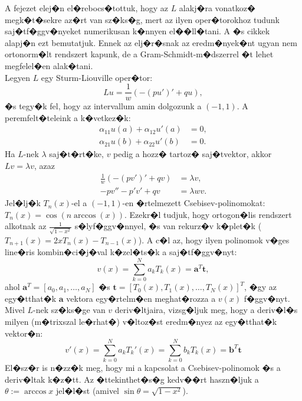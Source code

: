 A fejezet elej�n el�rebocs�tottuk, hogy az $L$ alakj�ra vonatkoz� megk�t�sekre az�rt van sz�ks�g, mert az ilyen oper�torokhoz tudunk saj�tf�ggv�nyeket numerikusan k�nnyen el��ll�tani. A  \cite{ChebysevTau} �s \cite{LISC} cikkek alapj�n ezt bemutatjuk. Ennek az elj�r�snak az eredm�nyek�nt ugyan nem ortonorm�lt rendszert kapunk, de a Gram-Schmidt-m�dszerrel �t lehet megfelel�en alak�tani. \\
Legyen $L$ egy Sturm-Liouville oper�tor:
\begin{equation*}
L u = \frac{1}{w} ( -(p u')' + q u),
\end{equation*}
�s tegy�k fel, hogy az intervallum amin dolgozunk a $(-1, 1)$. A peremfelt�teleink a k�vetkez�k:
\begin{align*}
\alpha_{11}u(a) + \alpha_{12}u'(a) &= 0, \\
\alpha_{21}u(b) + \alpha_{22}u'(b) &= 0.
\end{align*}
Ha $L$-nek $\lambda$ saj�t�rt�ke, $v$ pedig a hozz� tartoz� saj�tvektor, akkor $L v = \lambda v$, azaz
\begin{align}
\frac{1}{w} ( -(p v')' + q v) &= \lambda v, \nonumber \\
-p v'' - p' v' + q v &= \lambda w v. \label{eq:CT:2}
\end{align}
Jel�lj�k $T_n(x)$-el a $(-1, 1)$-en �rtelmezett Csebisev-polinomokat: $T_n(x) = \cos(n \arccos(x))$. Ezekr�l tudjuk, hogy ortogon�lis rendszert alkotnak az $\frac{1}{\sqrt{1 - x^2}}$ s�lyf�ggv�nnyel, �s van rekurz�v k�plet�k ($T_{n+1}(x) = 2xT_n(x) - T_{n-1}(x)$). A c�l az, hogy ilyen polinomok v�ges line�ris kombin�ci�j�val k�zel�ts�k a saj�tf�ggv�nyt:
\begin{equation*}
v(x) = \sum_{k = 0}^N a_k T_k(x) = \mathbf{a}^T \mathbf{t},
\end{equation*}
ahol $\mathbf{a}^T = [a_0, a_1, \dots, a_N]$ �s $\mathbf{t} = [T_0(x), T_1(x), \dots, T_N(x)]^T$, �gy az egy�tthat�k $\mathbf{a}$ vektora egy�rtelm�en meghat�rozza a $v(x)$ f�ggv�nyt. \\
Mivel $L$-nek sz�ks�ge van $v$ deriv�ltjaira, vizsg�ljuk meg, hogy a deriv�l�s milyen (m�trixszal le�rhat�) v�ltoz�st eredm�nyez az egy�tthat�k vektor�n:
\begin{equation}
v'(x) = \sum_{k = 0}^N a_k T_k'(x) = \sum_{k = 0}^N b_k T_k(x) = \mathbf{b}^T \mathbf{t} \label{eq:CT:1}
\end{equation}
El�sz�r is n�zz�k meg, hogy mi a kapcsolat a Csebisev-polinomok �s a deriv�ltak k�z�tt. Az �ttekinthet�s�g kedv��rt haszn�ljuk a $\theta := \arccos x$ jel�l�st (amivel $\sin \theta = \sqrt{1 - x^2}$).

